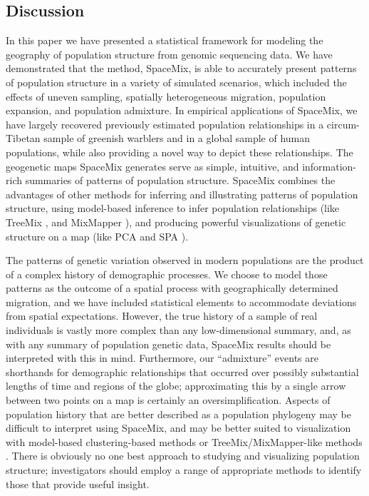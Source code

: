 \documentclass[10pt,letterpaper]{article}
\begin{document}
\subsection*{Discussion}
In this paper we have presented a statistical framework for modeling the geography of population structure from genomic sequencing data.
We have demonstrated that the method, SpaceMix, is able to accurately present patterns of population structure in a variety of simulated scenarios, which included the effects of uneven sampling, spatially heterogeneous migration, population expansion, and population admixture.  In empirical applications of SpaceMix, we have largely recovered previously estimated population relationships in a circum-Tibetan sample of greenish warblers and in a global sample of human populations, while also providing a novel way to depict these relationships.  The geogenetic maps SpaceMix generates serve as simple, intuitive, and information-rich summaries of patterns of population structure. 
SpaceMix combines the advantages of other methods for inferring and illustrating patterns of population structure, 
using model-based inference to infer population relationships (like TreeMix \cite{Treemix}, and MixMapper \cite{lipson_mixmapper_2013}), 
and producing powerful visualizations of genetic structure on a map (like PCA \cite{Patterson2006} and SPA \cite{yang_spatial_2014}).

The patterns of genetic variation observed in modern populations are the product of a complex history of demographic processes.  We choose to model those patterns as the outcome of a spatial process with geographically determined migration,
and we have included statistical elements to accommodate deviations from spatial expectations.
However, the true history of a sample of real individuals is vastly more complex than any low-dimensional summary,
and, as with any summary of population genetic data, 
SpaceMix results should be interpreted with this in mind.
Furthermore, our ``admixture'' events are shorthands for demographic relationships
that occurred over possibly substantial lengths of time and regions of the globe;
approximating this by a single arrow between two points on a map is certainly an oversimplification.
Aspects of population history that are better described as a population phylogeny may be difficult to interpret using SpaceMix,
and may be better suited to visualization with model-based clustering-based methods \cite{STRUCTURE} or TreeMix/MixMapper-like methods \cite{Treemix,lipson_mixmapper_2013}.  
There is obviously no one best approach to studying and visualizing population structure;
investigators should employ a range of appropriate methods to identify those that provide useful insight. 
\end{document}
